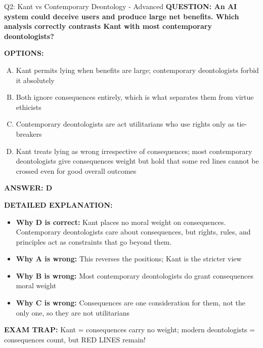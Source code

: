 \documentclass[8pt]{beamer}
\begin{document}
\begin{frame}[shrink=6]{Q2: Kant vs Contemporary Deontology - Advanced}
\fontsize{6.5}{7.5}\selectfont
\textbf{QUESTION: An AI system could deceive users and produce large net benefits. Which analysis correctly contrasts Kant with most contemporary deontologists?}

\vspace{0.1cm}
\textbf{OPTIONS:}
\begin{enumerate}[A.]
\item Kant permits lying when benefits are large; contemporary deontologists forbid it absolutely
\item Both ignore consequences entirely, which is what separates them from virtue ethicists
\item Contemporary deontologists are act utilitarians who use rights only as tie-breakers
\item Kant treats lying as wrong irrespective of consequences; most contemporary deontologists give consequences weight but hold that some red lines cannot be crossed even for good overall outcomes
\end{enumerate}

\vspace{0.1cm}
\textcolor{myblue}{\textbf{ANSWER: D}}

\vspace{0.1cm}
\textbf{DETAILED EXPLANATION:}
\begin{itemize}
\item \textbf{Why D is correct:} Kant places no moral weight on consequences. Contemporary deontologists care about consequences, but rights, rules, and principles act as constraints that go beyond them.
\item \textbf{Why A is wrong:} This reverses the positions; Kant is the stricter view
\item \textbf{Why B is wrong:} Most contemporary deontologists do grant consequences moral weight
\item \textbf{Why C is wrong:} Consequences are one consideration for them, not the only one, so they are not utilitarians
\end{itemize}

\textcolor{myred}{\textbf{EXAM TRAP:}} Kant = consequences carry no weight; modern deontologists = consequences count, but RED LINES remain!
\end{frame}
\end{document}
